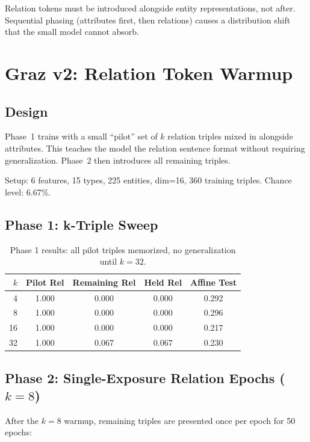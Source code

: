 \documentclass[11pt]{article}
\begin{document}
Relation tokens must be introduced alongside entity representations, not after.
Sequential phasing (attributes first, then relations) causes a distribution shift that
the small model cannot absorb.

\section{Graz v2: Relation Token Warmup}
\label{sec:v2}

\subsection{Design}

Phase~1 trains with a small ``pilot'' set of $k$ relation triples mixed in alongside
attributes. This teaches the model the relation sentence format without requiring
generalization.  Phase~2 then introduces all remaining triples.

Setup: 6 features, 15 types, 225 entities, dim=16, 360 training triples.
Chance level: 6.67\%.

\subsection{Phase 1: k-Triple Sweep}

\begin{table}[h]
\centering
\caption{Phase 1 results: all pilot triples memorized, no generalization until $k=32$.}
\begin{tabular}{rcccc}
\toprule
$k$ & Pilot Rel & Remaining Rel & Held Rel & Affine Test \\
\midrule
4 & 1.000 & 0.000 & 0.000 & 0.292 \\
8 & 1.000 & 0.000 & 0.000 & 0.296 \\
16 & 1.000 & 0.000 & 0.000 & 0.217 \\
32 & 1.000 & 0.067 & 0.067 & 0.230 \\
\bottomrule
\end{tabular}
\end{table}

\subsection{Phase 2: Single-Exposure Relation Epochs ($k=8$)}

After the $k=8$ warmup, remaining triples are presented once per epoch for 50 epochs:
\end{document}
